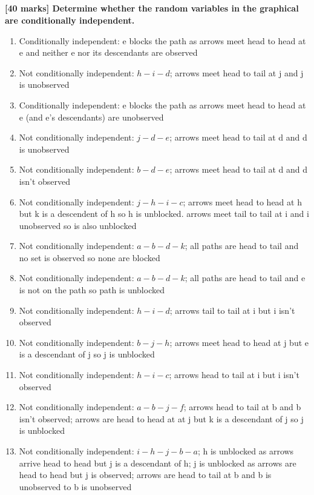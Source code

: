 \documentclass[12pt,twoside]{article}
\begin{document}
\subsection{}
\textbf{[40 marks] Determine whether the random variables in the graphical are conditionally independent.}
\begin{enumerate}[label=\alph*)]
    \item Conditionally independent: e blocks the path as arrows meet head to head at e and neither e nor its descendants are observed
    \item Not conditionally independent: $h - i - d$; arrows meet head to tail at j and j is unobserved
    \item Conditionally independent: e blocks the path as arrows meet head to head at e (and e's descendants) are unobserved
    \item Not conditionally independent: $j - d - e$; arrows meet head to tail at d and d is unobserved
    \item Not conditionally independent: $b - d - e$; arrows meet head to tail at d and d isn't observed
    \item Not conditionally independent: $j - h - i - c$; arrows meet head to head at h but k is a descendent of h so h is unblocked. arrows meet tail to tail at i and i unobserved so is also unblocked
    \item Not conditionally independent: $a - b - d - k$; all paths are head to tail and no set is observed so none are blocked 
    \item Not conditionally independent: $a - b - d - k$; all paths are head to tail and e is not on the path so path is unblocked
    \item Not conditionally independent: $h - i - d$; arrows tail to tail at i but i isn't observed
    \item Not conditionally independent: $b - j - h$; arrows meet head to head at j but e is a descendant of j so j is unblocked
    \item Not conditionally independent: $h - i - c$; arrows head to tail at i but i isn't observed
    \item Not conditionally independent: $a - b - j - f$; arrows head to tail at b and b isn't observed; arrows are head to head at at j but k is a descendant of j so j is unblocked
    \item Not conditionally independent: $i - h - j - b - a$; h is unblocked as arrows arrive head to head but j is a descendant of h; j is unblocked as arrows are head to head but j is observed; arrows are head to tail at b and b is unobserved to b is unobserved 

\end{enumerate}
\end{document}
